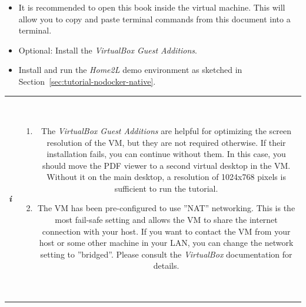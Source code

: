 \documentclass[12pt,english,parskip=half,headheight=19pt]{scrreprt}
\newcommand{\infobox}[1]{
  \par
  \medskip
  \hfill
  \setlength\arrayrulewidth{1pt}
  \begin{tabular}[t]{c|c|}
    \parbox{1.8em}{\hfill\textit{\Huge\textbf{i}\,}}
    &
    \,\parbox{0.89\linewidth}{\setlength{\parskip}{0.5em} \small #1}\,
  \end{tabular}
  \medskip
  \par
}
\newcommand{\idx}[1]{#1\index{#1}}
\newcommand{\refenv}[1]{\hyperref[env:#1]{\texttt{#1}}}        %
\begin{document}
\begin{itemize}[$\blacktriangleright$]
\item
  It is recommended to open this book inside the virtual machine.
  This will allow you to copy and paste terminal commands from this document into a terminal.

\item
  Optional: Install the \textit{VirtualBox Guest Additions}.

\item
  Install and run the \textit{Home2L} demo environment as sketched in
  Section~\ref{sec:tutorial-nodocker-native}.

\end{itemize}

\infobox{
  \begin{enumerate}
    \item
      The \textit{VirtualBox Guest Additions} are helpful for optimizing the screen resolution of the
      VM, but they are not required otherwise.
      If their installation fails, you can continue without them.
      In this case, you should move the PDF viewer to a second virtual desktop in the VM.
      Without it on the main desktop, a resolution of 1024x768 pixels is sufficient to run the
      tutorial.
    \item
      The VM has been pre-configured to use ''NAT'' networking. This is the most fail-safe setting and
      allows the VM to share the internet connection with your host. If you want to contact the VM from
      your host or some other machine in your LAN, you can change the network setting to ''bridged''.
      Please consult the \textit{VirtualBox} documentation for details.
    \end{enumerate}
}




%
\end{document}
